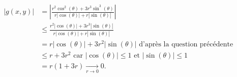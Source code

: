 {\begin{enumerate}
{		\begin{align*}
			|g(x,y)| & = \left|\frac{r^2\cos^2(\theta) + 3r^3\sin^3(\theta)}{r|\cos(\theta)| + r|\sin(\theta)|}\right| \\
			& \leq \frac{r^2|\cos(\theta)| + 3r^3|\sin(\theta)|}{r|\cos(\theta)| + r|\sin(\theta)|} \\
			& = r|\cos(\theta)| + 3r^2|\sin(\theta)| \text{ d'après la question précédente } \\
			& \leq r + 3r^2 \text{ car } |\cos(\theta)| \leq 1 \text{ et } |\sin(\theta)| \leq 1 \\
			& = r(1 + 3r) \xrightarrow[r \to 0]{} 0.
		\end{align*}
	}
\end{enumerate}
}